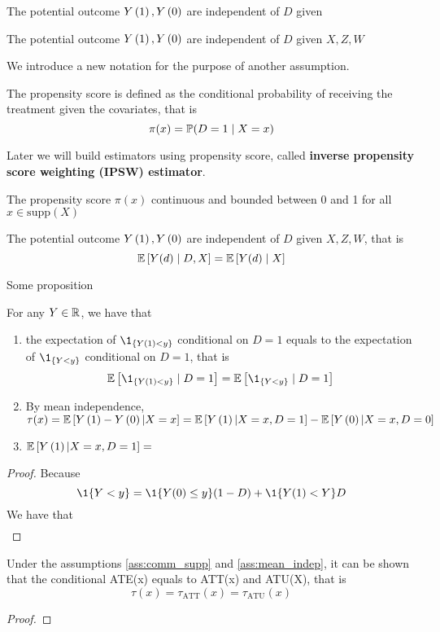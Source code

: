 \begin{assumption}
    The potential outcome $Y\left(1\right),Y\left(0\right)$ are independent of $D$ given
\end{assumption}
\begin{assumption}
    The potential outcome $Y\left(1\right),Y\left(0\right)$ are independent of $D$ given $X,Z,W$
\end{assumption}
We introduce a new notation for the purpose of another assumption.
\begin{definition}
    The propensity score is defined as the conditional probability of receiving the treatment given the covariates, that is \[\pi(x)=\mathbb{P}(D=1\mid X=x)\]
\end{definition}
\begin{remark}
    Later we will build estimators using propensity score, called \textbf{inverse propensity score weighting (IPSW) estimator}.
\end{remark}
\begin{assumption}\label{ass:comm_supp}
    The propensity score $\pi(x)$ continuous and bounded between 0 and 1 for all $x\in \text{supp}(X)$
\end{assumption}
\begin{assumption}\label{ass:mean_indep}
    The potential outcome $Y\left(1\right),Y\left(0\right)$ are independent of $D$ given $X,Z,W$, that is \[\mathbb{E}\left[Y(d)\mid D,X\right]=\mathbb{E}\left[Y(d)\mid X\right]\]
\end{assumption}
Some proposition
\begin{proposition}
    For any $Y\in \mathbb{R}$, we have that
    \begin{enumerate}
        \item the expectation of $\1_{\set{Y(1)<y}}$ conditional on $D=1$ equals to the
              expectation of $\1_{\set{Y<y}}$ conditional on $D=1$, that is
              \begin{equation*}
                  \E\bra{\1_{\set{Y(1)<y}}\mid D=1} = \E\bra{\1_{\set{Y<y}}\mid D=1}
              \end{equation*}
        \item By mean independence, $\tau(x) =
                  \mathbb{E}\left[Y\left(1\right)-Y\left(0\right)|X=x\right]=\mathbb{E}\left[Y\left(1\right)|X=x,D=1\right]-\mathbb{E}\left[Y\left(0\right)|X=x,D=0\right]$
        \item $\mathbb{E}\left[Y\left(1\right)|X=x,D=1\right]=$
    \end{enumerate}
\end{proposition}
\begin{proof}
    Because \[
        \1\{Y<y\}=\1\{Y(0)\le y\}(1-D) +\1\{Y(1)<Y\}D \]
    We have that
    \begin{align*}
    \end{align*}
\end{proof}

\begin{proposition}
    Under the assumptions \ref{ass:comm_supp} and \ref{ass:mean_indep}, it can be shown that the conditional ATE(x) equals to ATT(x) and ATU(X), that is \[\tau(x)=\tau_{\text{ATT}}(x)=\tau_{\text{ATU}}(x)\]
\end{proposition}
\begin{proof}

\end{proof}